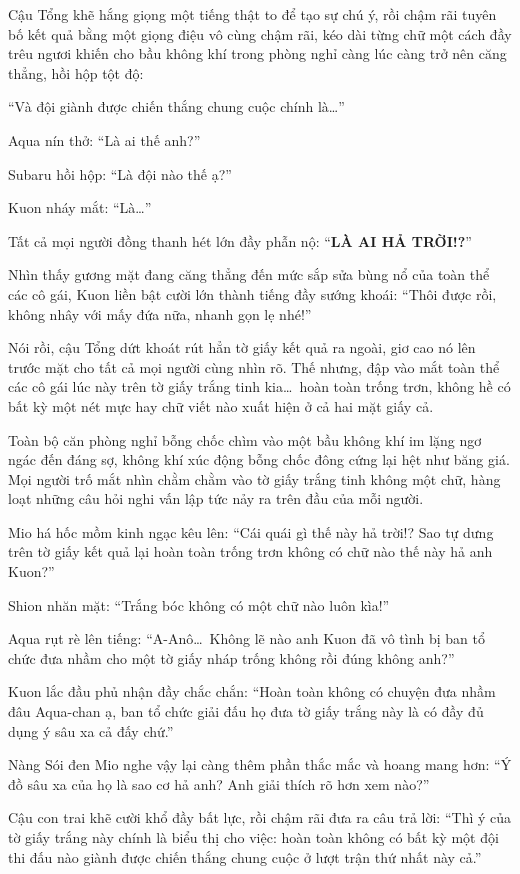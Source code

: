 \documentclass[../main.tex]{subfiles}
\begin{document}
Cậu Tổng khẽ hắng giọng một tiếng thật to để tạo sự chú ý, rồi chậm rãi tuyên bố kết quả bằng một giọng điệu vô cùng chậm rãi, kéo dài từng chữ một cách đầy trêu ngươi khiến cho bầu không khí trong phòng nghỉ càng lúc càng trở nên căng thẳng, hồi hộp tột độ:

``Và đội giành được chiến thắng chung cuộc chính là\dots''

Aqua nín thở: ``Là ai thế anh?''

Subaru hồi hộp: ``Là đội nào thế ạ?''

Kuon nháy mắt: ``Là\dots''

Tất cả mọi người đồng thanh hét lớn đầy phẫn nộ: ``\textbf{LÀ AI HẢ TRỜI!?}''

Nhìn thấy gương mặt đang căng thẳng đến mức sắp sửa bùng nổ của toàn thể các cô gái, Kuon liền bật cười lớn thành tiếng đầy sướng khoái: ``Thôi được rồi, không nhây với mấy đứa nữa, nhanh gọn lẹ nhé!''

Nói rồi, cậu Tổng dứt khoát rút hẳn tờ giấy kết quả ra ngoài, giơ cao nó lên trước mặt cho tất cả mọi người cùng nhìn rõ. Thế nhưng, đập vào mắt toàn thể các cô gái lúc này trên tờ giấy trắng tinh kia\dots\ hoàn toàn trống trơn, không hề có bất kỳ một nét mực hay chữ viết nào xuất hiện ở cả hai mặt giấy cả.

Toàn bộ căn phòng nghỉ bỗng chốc chìm vào một bầu không khí im lặng ngơ ngác đến đáng sợ, không khí xúc động bỗng chốc đông cứng lại hệt như băng giá. Mọi người trố mắt nhìn chằm chằm vào tờ giấy trắng tinh không một chữ, hàng loạt những câu hỏi nghi vấn lập tức nảy ra trên đầu của mỗi người.

Mio há hốc mồm kinh ngạc kêu lên: ``Cái quái gì thế này hả trời!? Sao tự dưng trên tờ giấy kết quả lại hoàn toàn trống trơn không có chữ nào thế này hả anh Kuon?''

Shion nhăn mặt: ``Trắng bóc không có một chữ nào luôn kìa!''

Aqua rụt rè lên tiếng: ``A-Anô\dots\ Không lẽ nào anh Kuon đã vô tình bị ban tổ chức đưa nhầm cho một tờ giấy nháp trống không rồi đúng không anh?''

Kuon lắc đầu phủ nhận đầy chắc chắn: ``Hoàn toàn không có chuyện đưa nhầm đâu Aqua-chan ạ, ban tổ chức giải đấu họ đưa tờ giấy trắng này là có đầy đủ dụng ý sâu xa cả đấy chứ.''

Nàng Sói đen Mio nghe vậy lại càng thêm phần thắc mắc và hoang mang hơn: ``Ý đồ sâu xa của họ là sao cơ hả anh? Anh giải thích rõ hơn xem nào?''

Cậu con trai khẽ cười khổ đầy bất lực, rồi chậm rãi đưa ra câu trả lời: ``Thì ý của tờ giấy trắng này chính là biểu thị cho việc: hoàn toàn không có bất kỳ một đội thi đấu nào giành được chiến thắng chung cuộc ở lượt trận thứ nhất này cả.''
\end{document}
